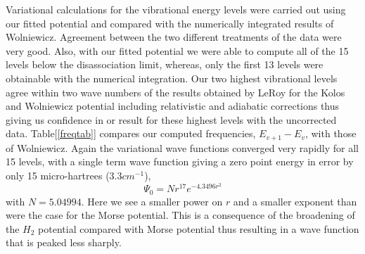 \documentclass[12pt,thmsa]{article}
\begin{document}
Variational calculations for the vibrational energy levels were carried out
using our fitted potential and compared with the numerically integrated
results of Wolniewicz\cite{Wolniewicz66}. Agreement between the two
different treatments of the data were very good. Also, with our fitted
potential we were able to compute all of the 15 levels below the
disassociation limit, whereas, only the first 13 levels were obtainable with
the numerical integration. Our two highest vibrational levels agree within
two wave numbers of the results obtained by LeRoy\cite{LeRoy68} for the
Kolos and Wolniewicz potential including relativistic and adiabatic
corrections thus giving us confidence in or result for these highest levels
with the uncorrected data. Table[\ref{freqtab}] compares our computed
frequencies, $E_{v+1}-E_v$, with those of Wolniewicz\cite{Wolniewicz66}.
Again the variational wave functions converged very rapidly for all 15
levels, with a single term wave function giving a zero point energy in error
by only 15 micro-hartrees (3.3$cm^{-1}$), 
\begin{equation}
\Psi _0=Nr^{17}e^{-4.3496r^2}
\end{equation}
with $N=5.04994$. Here we see a smaller power on $r$ and a smaller exponent
than were the case for the Morse potential. This is a consequence of the
broadening of the $H_2$ potential compared with Morse potential thus
resulting in a wave function that is peaked less sharply.
\end{document}

